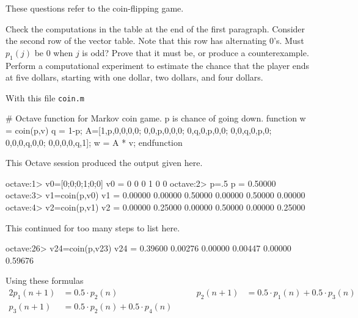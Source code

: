 \begin{exercises}
  \item 
    These questions refer to the coin-flipping game.
    \begin{exparts}
     \partsitem Check the computations in the table at the end of the
       first paragraph.
     \partsitem Consider the second row of the vector table.
       Note that this row has alternating $0$'s.  
       Must $p_{1}(j)$ be $0$ when $j$ is odd?
       Prove that it must be, or produce a counterexample.
     \partsitem Perform a computational experiment to estimate
       the chance that the player ends at five dollars, 
       starting with one dollar, two dollars, and four dollars.
    \end{exparts}
    \begin{answer}
      \begin{exparts}
        \partsitem With this file \texttt{coin.m}
\begin{computercode}         
# Octave function for Markov coin game.  p is chance of going down.
function w = coin(p,v)
  q = 1-p;
  A=[1,p,0,0,0,0;
     0,0,p,0,0,0;
     0,q,0,p,0,0;
     0,0,q,0,p,0;
     0,0,0,q,0,0;
     0,0,0,0,q,1];
  w = A * v;
endfunction
\end{computercode}
         This Octave session produced the output given here. 
\begin{computercode}
octave:1> v0=[0;0;0;1;0;0]
v0 =
  0
  0
  0
  1
  0
  0
octave:2> p=.5
p = 0.50000
octave:3> v1=coin(p,v0)
v1 =
  0.00000
  0.00000
  0.50000
  0.00000
  0.50000
  0.00000
octave:4> v2=coin(p,v1)
v2 =
  0.00000
  0.25000
  0.00000
  0.50000
  0.00000
  0.25000
\end{computercode}
This continued for too many steps to list here.
\begin{computercode}
octave:26> v24=coin(p,v23)
v24 =
  0.39600
  0.00276
  0.00000
  0.00447
  0.00000
  0.59676
\end{computercode}        
        \partsitem Using these formulas
          \begin{alignat*}{2}
             p_{1}(n+1) &= 0.5\cdot p_{2}(n)
             &\qquad
             p_{2}(n+1) &= 0.5\cdot p_{1}(n)+0.5\cdot p_{3}(n)
                                                              \\
             p_{3}(n+1) &= 0.5\cdot p_{2}(n)+0.5\cdot p_{4}(n)
             &\qquad

\end{alignat*}
\end{exparts}
\end{answer}
\end{exercises}
